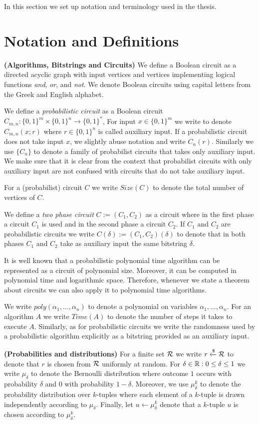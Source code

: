 In this section we set up notation and terminology used in the thesis.
%
\section{Notation and Definitions}
\textbf{(Algorithms, Bitstrings and Circuits)}
We define a Boolean circuit as a directed acyclic graph with input vertices and vertices implementing logical functions \textit{and}, \textit{or}, and \textit{not}.
We denote Boolean circuits using capital letters from the Greek and English alphabet.

We define a \textit{probabilistic circuit} as a Boolean circuit $C_{m,n} : \{0,1\}^{m} \times \{0,1\}^{n} \rightarrow \{0,1\}^{*}$,
For input $x \in \{0,1\}^{m}$ we write to denote $C_{m,n}(x;r)$ where $r \in \{0,1\}^{n}$ is called auxiliary input.
If a probabilistic circuit does not take input $x$, we slightly abuse notation and write $C_{n}(r)$.
Similarly we use $\{C_n\}$ to denote a family of probabilist circuits that takes only auxiliary input.
We make sure that it is clear from the context that probabilist circuits with only auxiliary input
are not confused with circuits that do not take auxiliary input.

For a (probabilist) circuit $C$ we write $\mathit{Size}(C)$ to denote the total number of vertices of $C$.

We define a \textit{two phase circuit} $C := (C_1, C_2)$ as a circuit where in the first phase a circuit $C_1$ is used and in the second phase a circuit $C_2$.
If $C_1$ and $C_2$ are probabilistic circuits we write $C(\delta) := (C_1, C_2)(\delta)$ to denote that in both phases $C_1$ and $C_2$ take
as auxiliary input the same bitstring $\delta$.

It is well known \cite{Arora:2009:CCM:1540612} that a probabilistic polynomial time algorithm can be represented as a circuit of polynomial size.
Moreover, it can be computed in polynomial time and logarithmic space.
Therefore, whenever we state a theorem about circuits we can also apply it to polynomial time algorithms.

We write $\mathit{poly}(\alpha_1, \dots, \alpha_n)$ to denote a polynomial on variables $\alpha_1, \dots, \alpha_n$.
For an algorithm $A$ we write $\mathit{Time}(A)$ to denote the number of steps it takes to execute $A$.
Similarly, as for probabilistic circuits we write the randomness used by a probabilistic algorithm explicitly as a bitstring provided as an auxiliary input.

\textbf{(Probabilities and distributions)}
For a finite set $\mathcal{R}$ we write $r \xleftarrow{\$} \mathcal{R}$ to denote that $r$ is chosen from $\mathcal{R}$ uniformly at random.
For $\delta \in \mathbb{R} : 0 \leq \delta \leq 1$ we write $\mu_{\delta}$ to denote the Bernoulli distribution where outcome $1$ occurs with
probability $\delta$ and $0$ with probability $1-\delta$.
Moreover, we use $\mu_{\delta}^k$ to denote the probability distribution over $k$-tuples
where each element of a $k$-tuple is drawn independently according to $\mu_{\delta}$.
Finally, let $u \leftarrow \mu_{\delta}^k$ denote that a $k$-tuple $u$ is chosen according to $\mu_{\delta}^k$.

